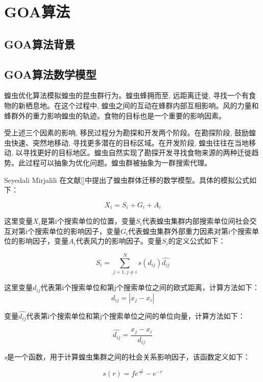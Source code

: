 \section{GOA算法}
\subsection{GOA算法背景}
\subsection{GOA算法数学模型}
蝗虫优化算法模拟蝗虫的昆虫群行为。蝗虫蜂拥而至, 远距离迁徙, 寻找一个有食物的新栖息地。在这个过程中, 蝗虫之间的互动在蜂群内部互相影响。风的力量和蜂群外的重力影响蝗虫的轨迹。食物的目标也是一个重要的影响因素。

受上述三个因素的影响, 移民过程分为勘探和开发两个阶段。在勘探阶段, 鼓励蝗虫快速、突然地移动, 寻找更多潜在的目标区域。在开发阶段, 蝗虫往往在当地移动, 以寻找更好的目标地区。蝗虫自然实现了勘探开发寻找食物来源的两种迁徙趋势。此过程可以抽象为优化问题。蝗虫群被抽象为一群搜索代理。

Seyedali Mirjalili 在文献[]中提出了蝗虫群体迁移的数学模型。具体的模拟公式如下：

\begin{equation}
    X_i = S_i + G_i + A_i 
\end{equation}

这里变量$X_i$是第i个搜索单位的位置，变量$S_i$代表蝗虫集群内部搜索单位间社会交互对第i个搜索单位的影响因子，变量$G_i$代表蝗虫集群外部重力因素对第i个搜索单位的影响因子，变量$A_i$代表风力的影响因子。变量$S_i$的定义公式如下：

\begin{equation}
    S_i = \sum_{j=1, j\neq{i}}^N s(d_{ij})\widehat{d_{ij}}
\end{equation}

这里变量$d_{ij}$代表第i个搜索单位和第j个搜索单位之间的欧式距离，计算方法如下：
\begin{equation}
    d_{ij}=|x_j-x_i|
\end{equation}

变量$\widehat{d_{ij}}$代表第i个搜索单位和第j个搜索单位之间的单位向量，计算方法如下：

\begin{equation}
    \widehat{d_{ij}}=\frac{x_j-x_i}{d_{ij}}
\end{equation}

\emph{s}是一个函数，用于计算蝗虫集群之间的社会关系影响因子，该函数定义如下：

\begin{equation}
    s(r) = fe^{\frac{-r}{l}}-e^{-r}
\end{equation}

